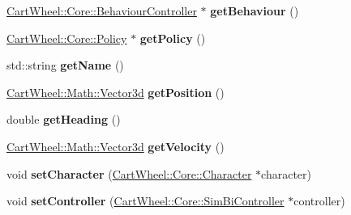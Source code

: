 \begin{DoxyCompactItemize}
\item 
\hypertarget{classCartWheel_1_1Core_1_1Human_aaa6da7be945c0d7ddf3e6f0345ead467}{
\hyperlink{classCartWheel_1_1Core_1_1BehaviourController}{CartWheel::Core::BehaviourController} $\ast$ {\bfseries getBehaviour} ()}
\label{classCartWheel_1_1Core_1_1Human_aaa6da7be945c0d7ddf3e6f0345ead467}

\item 
\hypertarget{classCartWheel_1_1Core_1_1Human_a48f62c900e7c518232f6234fce5148ab}{
\hyperlink{classCartWheel_1_1Core_1_1Policy}{CartWheel::Core::Policy} $\ast$ {\bfseries getPolicy} ()}
\label{classCartWheel_1_1Core_1_1Human_a48f62c900e7c518232f6234fce5148ab}

\item 
\hypertarget{classCartWheel_1_1Core_1_1Human_a2f0c465702f645ee25d4caedf4350bec}{
std::string {\bfseries getName} ()}
\label{classCartWheel_1_1Core_1_1Human_a2f0c465702f645ee25d4caedf4350bec}

\item 
\hypertarget{classCartWheel_1_1Core_1_1Human_a3c2cb16d7c50e886284fb9a05e886fe6}{
\hyperlink{classCartWheel_1_1Math_1_1Vector3d}{CartWheel::Math::Vector3d} {\bfseries getPosition} ()}
\label{classCartWheel_1_1Core_1_1Human_a3c2cb16d7c50e886284fb9a05e886fe6}

\item 
\hypertarget{classCartWheel_1_1Core_1_1Human_a00bed2ea064ddff3ca322c15e095d600}{
double {\bfseries getHeading} ()}
\label{classCartWheel_1_1Core_1_1Human_a00bed2ea064ddff3ca322c15e095d600}

\item 
\hypertarget{classCartWheel_1_1Core_1_1Human_af022ad2caa9f2ed0161a697f7a7b3931}{
\hyperlink{classCartWheel_1_1Math_1_1Vector3d}{CartWheel::Math::Vector3d} {\bfseries getVelocity} ()}
\label{classCartWheel_1_1Core_1_1Human_af022ad2caa9f2ed0161a697f7a7b3931}

\item 
\hypertarget{classCartWheel_1_1Core_1_1Human_aa1d657acf6de76e262b51e025e7d97fc}{
void {\bfseries setCharacter} (\hyperlink{classCartWheel_1_1Core_1_1Character}{CartWheel::Core::Character} $\ast$character)}
\label{classCartWheel_1_1Core_1_1Human_aa1d657acf6de76e262b51e025e7d97fc}

\item 
\hypertarget{classCartWheel_1_1Core_1_1Human_ab19877d26c36f028c8ad54772df00934}{
void {\bfseries setController} (\hyperlink{classCartWheel_1_1Core_1_1SimBiController}{CartWheel::Core::SimBiController} $\ast$controller)}
\label{classCartWheel_1_1Core_1_1Human_ab19877d26c36f028c8ad54772df00934}


\end{DoxyCompactItemize}
